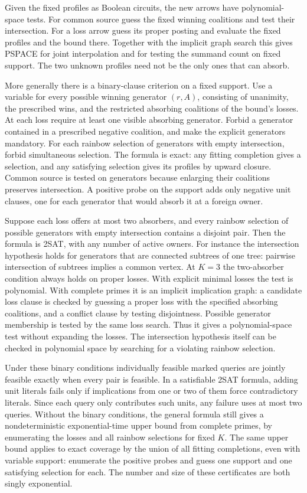 Given the fixed profiles as Boolean circuits,
the new arrows have polynomial-space tests.
For common source guess the fixed winning
coalitions and test their intersection. For a
loss arrow guess its proper posting and evaluate
the fixed profiles and the bound there. Together
with the implicit graph search this gives PSPACE
for joint interpolation and for testing the
summand count on fixed support. The two unknown
profiles need not be the only ones that can
absorb.

More generally there is a binary-clause criterion on a
fixed support. Use a variable for every possible winning
generator $(r,A)$, consisting of unanimity, the prescribed
wins, and the restricted absorbing coalitions of the bound's
losses. At each loss require at least one visible absorbing
generator. Forbid a generator contained in a prescribed
negative coalition, and make the explicit generators
mandatory. For each rainbow selection of generators with
empty intersection, forbid simultaneous selection.
The formula is exact: any fitting completion gives a
selection, and any satisfying selection gives its profiles
by upward closure. Common source is tested on generators
because enlarging their coalitions preserves intersection.
A positive probe on the support adds only negative unit
clauses, one for each generator that would absorb it at
a foreign owner.

Suppose each loss offers at most two absorbers, and every
rainbow selection of possible generators with empty
intersection contains a disjoint pair. Then the formula
is 2SAT, with any number of active owners. For instance
the intersection hypothesis holds for generators that
are connected subtrees of one tree: pairwise intersection
of subtrees implies a common vertex. At $K=3$ the
two-absorber condition always holds on proper losses.
With explicit minimal losses the test is polynomial.
With complete primes it is an implicit implication
graph: a candidate loss clause is checked by guessing
a proper loss with the specified absorbing coalitions,
and a conflict clause by testing disjointness. Possible
generator membership is tested by the same loss search.
Thus it gives a polynomial-space test without expanding
the losses. The intersection hypothesis itself can be
checked in polynomial space by searching for a violating
rainbow selection.

Under these binary conditions individually feasible
marked queries are jointly feasible exactly when every
pair is feasible. In a satisfiable 2SAT formula, adding
unit literals fails only if implications from one or
two of them force contradictory literals. Since each
query only contributes such units, any failure uses
at most two queries. Without the binary conditions,
the general formula still gives a nondeterministic
exponential-time upper bound from complete primes,
by enumerating the losses and all rainbow selections
for fixed $K$. The same upper bound applies to exact
coverage by the union of all fitting completions,
even with variable support: enumerate the positive
probes and guess one support and one satisfying
selection for each. The number and size of these
certificates are both singly exponential.

